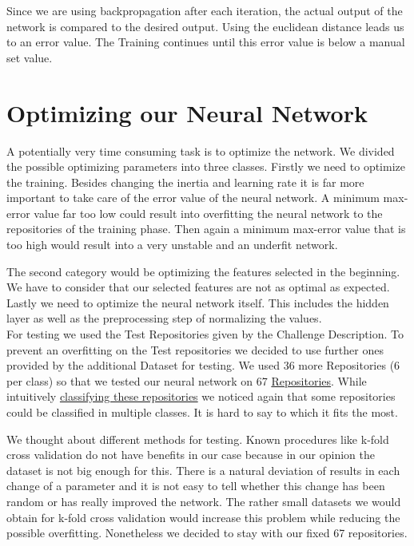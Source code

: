 \documentclass[paper=A4,pagesize=auto,12pt,headinclude=true,footinclude=true,BCOR=0mm,DIV=calc]{scrartcl}
\begin{document}
	Since we are using backpropagation after each iteration, the actual output of the network is compared to the desired output. Using the euclidean distance leads us to an error value. The Training continues until this error value is below a manual set value.
	
	
	
	\section{Optimizing our Neural Network }
	\label{src:optimizing}
	A potentially very time consuming task is to optimize the network. We divided the possible optimizing parameters into three classes. Firstly we need to optimize the training. Besides changing the inertia and learning rate it is far more important to take care of the error value of the neural network. A minimum max-error value far too low could result into overfitting the neural network to the repositories of the training phase. Then again a minimum max-error value that is too high would result into a very unstable and an underfit network. 
	
	The second category would be optimizing the features selected in the beginning. We have to consider that our selected features are not as optimal as expected.
	Lastly we need to optimize the neural network itself. This includes the hidden layer as well as the preprocessing step of normalizing the values.\\
	For testing we used the Test Repositories given by the Challenge Description. To prevent an overfitting on the Test repositories we decided to use further ones provided by the additional Dataset for testing. We used 36 more Repositories (6 per class) so that we tested our neural network on 67 \hyperref[src:TestRepositories]{Repositories}. While intuitively \hyperref[src:ClassifyTestRepositories]{classifying these repositories} we noticed again that some repositories could be classified in multiple classes. It is hard to say to which it fits the most. 
	
	 We thought about different methods for testing. Known procedures like k-fold cross validation do not have benefits in our case because in our opinion the dataset is not big enough for this. There is a natural deviation of results in each change of a parameter and it is not easy to tell whether this change has been random or has really improved the network. The rather small datasets we would obtain for k-fold cross validation would increase this problem while reducing the possible overfitting. Nonetheless we decided to stay with our fixed 67 repositories.
	 
\end{document}
